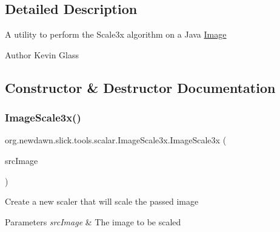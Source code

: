 \subsection{Detailed Description}
A utility to perform the Scale3x algorithm on a Java \mbox{\hyperlink{classorg_1_1newdawn_1_1slick_1_1_image}{Image}}

\begin{DoxyAuthor}{Author}
Kevin Glass 
\end{DoxyAuthor}


\subsection{Constructor \& Destructor Documentation}
\mbox{\label{classorg_1_1newdawn_1_1slick_1_1tools_1_1scalar_1_1_image_scale3x_ae271f29b00010fb6c4f20ba00ca58461}} 
\subsubsection{\texorpdfstring{Image\+Scale3x()}{ImageScale3x()}}
{\footnotesize\ttfamily org.\+newdawn.\+slick.\+tools.\+scalar.\+Image\+Scale3x.\+Image\+Scale3x (\begin{DoxyParamCaption}\item[{Buffered\+Image}]{src\+Image }\end{DoxyParamCaption})\hspace{0.3cm}{\ttfamily [inline]}}

Create a new scaler that will scale the passed image


\begin{DoxyParams}{Parameters}
{\em src\+Image} & The image to be scaled \\
\hline
\end{DoxyParams}

